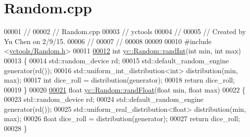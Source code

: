 \hypertarget{_random_8cpp_source}{}\section{Random.\+cpp}
\label{_random_8cpp_source}

\begin{DoxyCode}
00001 \textcolor{comment}{//}
00002 \textcolor{comment}{//  Random.cpp}
00003 \textcolor{comment}{//  yctools}
00004 \textcolor{comment}{//}
00005 \textcolor{comment}{//  Created by Yu Chen on 2/9/15.}
00006 \textcolor{comment}{//}
00007 \textcolor{comment}{//}
00008 
00009 
00010 \textcolor{preprocessor}{#include <\hyperlink{_random_8h}{yctools/Random.h}>}
00011 
\hypertarget{_random_8cpp_source_l00012}{}\hyperlink{classyc_1_1_random_a8cf4d84430a8a030f93078d439d819b8}{00012} \textcolor{keywordtype}{int} \hyperlink{classyc_1_1_random_a8cf4d84430a8a030f93078d439d819b8}{yc::Random::randInt}(\textcolor{keywordtype}{int} min, \textcolor{keywordtype}{int} max)
00013 \{
00014     std::random\_device rd;
00015     std::default\_random\_engine generator(rd());
00016     std::uniform\_int\_distribution<int> distribution(min, max);
00017     \textcolor{keywordtype}{int} dice\_roll = distribution(generator);
00018     \textcolor{keywordflow}{return} dice\_roll;
00019 \}
00020 
\hypertarget{_random_8cpp_source_l00021}{}\hyperlink{classyc_1_1_random_ad31bfbe073976c464fa24173c0b669f9}{00021} \textcolor{keywordtype}{float} \hyperlink{classyc_1_1_random_ad31bfbe073976c464fa24173c0b669f9}{yc::Random::randFloat}(\textcolor{keywordtype}{float} min, \textcolor{keywordtype}{float} max)
00022 \{
00023     std::random\_device rd;
00024     std::default\_random\_engine generator(rd());
00025     std::uniform\_real\_distribution<float> distribution(min, max);
00026     \textcolor{keywordtype}{float} dice\_roll = distribution(generator);
00027     \textcolor{keywordflow}{return} dice\_roll;
00028 \}
\end{DoxyCode}
